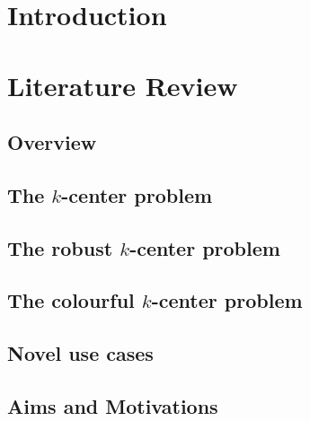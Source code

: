 \documentclass{article}
\begin{document}

\newpage
\begin{abstract}

\end{abstract}
\newpage

\newpage
\tableofcontents
\newpage
\section{Introduction}


\section{Literature Review}\label{section:lit_review}

    \subsection{Overview}
    
    
    \subsection{The \texorpdfstring{$k$}{k}-center problem}\label{section:k_center}
    
    
    \subsection{The robust \texorpdfstring{$k$}{k}-center problem}\label{section:robust_k_center}
    
    
    \subsection{The colourful \texorpdfstring{$k$}{k}-center problem}\label{section:colourful_k_center}
    
    
    \subsection{Novel use cases}
    
    
    \subsection{Aims and Motivations}
    
    
\end{document}
